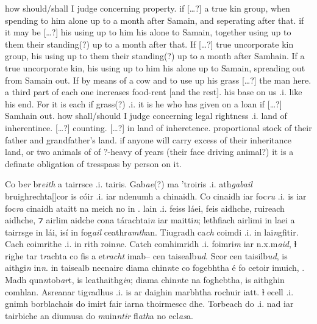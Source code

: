 \documentclass[11pt]{article}
\begin{document}
\begin{pages}
\begin{Rightside}
    \pstart
    how should/shall I judge concerning property. if [\ldots?] a true kin group, when spending to him alone up to a month after Samain, and seperating after that. if it may be [\ldots?] his using up to him his alone to Samain, together using up to them their standing(?) up to a month after that.  If [\ldots?] true uncorporate kin group, his using up to them their standing(?) up to a month after Samhain.  If a true uncorporate kin, his using up to him his alone up to Samain, spreading out from Samain out.  If by means of a cow and to use up his grass [\ldots?] the man here.  a third part of each one increases food-rent [and the rest].\hspace{2mm} his base on us .i. like his end. For it is each if grass(?) .i. it is he who has given on a loan if [\ldots?] Samhain out.  how shall/should I judge concerning legal rightness .i. land of inherentince.  [\ldots?] counting.  [\ldots?] in land of inheretence.  proportional stock of their father and grandfather's land. if anyone will carry excess of their inheritance land, or two animals of of ?-heavy of years (their face driving animal?) it is a definate obligation of tresspass by person on it. 

    \pend
  \endnumbering
  \end{Rightside}

  \Pages

  
  \begin{Leftside}
    \beginnumbering
    \pstart
    Co b\emph{er} br\emph{eith} a tairrsce .i.  tairis.  Gab\emph{ae}(?) ma 'troiris .i. ath\emph{gabail} bruighrechta[\hspace{2mm}]cor is c\'{o}ir .i. iar ndenumh a chinaidh.  Co cinaidh iar foc\emph{ru} .i. is iar foc\emph{ra} cinaidh ataitt na meich no in .   lain .i. feiss l\'{a}ei, feis aidhche, ruireach aidhche, ⁊ airlim aidche cona t\'{a}rachtai\emph{n} iar maitti\emph{n}; lethfiach airlimi in laei a tairrsge in l\'{a}i, is\'{i} in fog\emph{ail} ceathr\emph{amth}an.  Tiugradh  ca\emph{ch} coimdi .i. in lai\emph{n}gfitir.  Cach coimrithe .i. in rith roin\emph{n}e.  Catch comhimridh .i. foimri\emph{m} iar n.x.m\emph{aid}, ɫ righe tar t\emph{r}achta co fis a et\emph{racht} imab-- cen taisealb\emph{ud}.  Scor cen taisilb\emph{ud}, is aithgi\emph{n} in\emph{n}.  in taisealb necnairc diama chin\emph{n}te co fogebhtha \'{e} fo cetoir imuich, .  Madh qun\emph{n}tob\emph{ar}t, is leathaithg\emph{in}; diama chin\emph{n}te na foghebtha, is aithghin comhlan.  Asreanar tig\emph{r}adhus .i. is ar daighin marbhtha rochuir iatt. ɫ ecell .i. gnimh borblachais do imirt fair iarna thoirmescc dhe. Torbeach do  .i. nad iar tairbiche an diumusa do \emph{m}uin\emph{ntir} fl\emph{ath}a no ecl\emph{as}a. 
    \pend
  \endnumbering
  \end{Leftside}


\end{pages}
\end{document}
